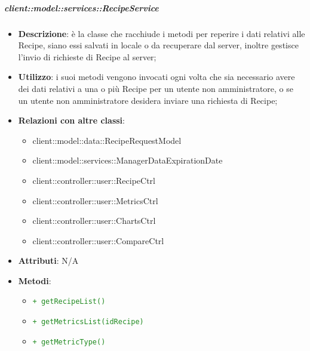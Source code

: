 		\subparagraph{client::model::services::RecipeService} %
		\label{subp:client_model_services_recipeservice}
			\begin{itemize}
				\item \textbf{Descrizione}: è la classe che racchiude i metodi per reperire i dati relativi alle Recipe, siano essi salvati in locale o da recuperare dal server, inoltre gestisce l'invio di richieste di Recipe al server;
				\item \textbf{Utilizzo}: i suoi metodi vengono invocati ogni volta che sia necessario avere dei dati relativi a una o più Recipe per un utente non amministratore, o se un utente non amministratore desidera inviare una richiesta di Recipe;
				\item \textbf{Relazioni con altre classi}:
					\begin{itemize}
						\item client::model::data::RecipeRequestModel
						\item client::model::services::ManagerDataExpirationDate
						\item client::controller::user::RecipeCtrl
						\item client::controller::user::MetricsCtrl
						\item client::controller::user::ChartsCtrl
						\item client::controller::user::CompareCtrl
					\end{itemize}
				\item \textbf{Attributi}: N/A
				\item \textbf{Metodi}:
				\begin{itemize}
					\item \textcolor{forestgreen}{\texttt{+ getRecipeList()}}
					\item \textcolor{forestgreen}{\texttt{+ getMetricsList(idRecipe)}}
					\item \textcolor{forestgreen}{\texttt{+ getMetricType()}}
\end{itemize}
\end{itemize}
